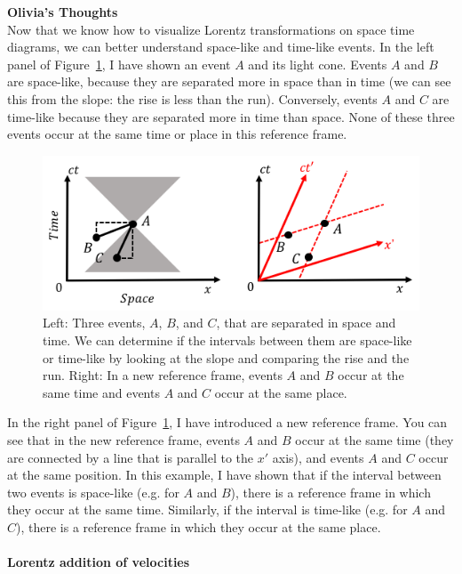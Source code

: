 \begin{framed}
\textbf{Olivia's Thoughts}\\
Now that we know how to visualize Lorentz transformations on space time diagrams, we can better understand space-like and time-like events. In the left panel of Figure~\ref{fig:specialrelativity:spacetimelike}, I have shown an event $A$ and its light cone. Events $A$ and $B$ are space-like, because they are separated more in space than in time (we can see this from the slope: the rise is less than the run). Conversely, events $A$ and $C$ are time-like because they are separated more in time than space. None of these three events occur at the same time or place in this reference frame.

\begin{figure}[!htbp]
\centering
\includegraphics[width=0.8\linewidth]{files/spaceliketimelike-6bcf172ccd155ee5d3ea785d3705d79f.png}
\caption[]{Left: Three events, $A$, $B$, and $C$, that are separated in space and time. We can determine if the intervals between them are space-like or time-like by looking at the slope and comparing the rise and the run. Right: In a new reference frame, events $A$ and $B$ occur at the same time and events $A$ and $C$ occur at the same place.}
\label{fig:specialrelativity:spacetimelike}
\end{figure}

In the right panel of Figure~\ref{fig:specialrelativity:spacetimelike}, I have introduced a new reference frame. You can see that in the new reference frame, events $A$ and $B$ occur at the same time (they are connected by a line that is parallel to the $x'$ axis), and events $A$ and $C$ occur at the same position. In this example, I have shown that if the interval between two events is space-like (e.g. for $A$ and $B$), there is a reference frame in which they occur at the same time. Similarly, if the interval is time-like (e.g. for $A$ and $C$), there is a reference frame in which they occur at the same place.
\end{framed}

\paragraph{Lorentz addition of velocities}

